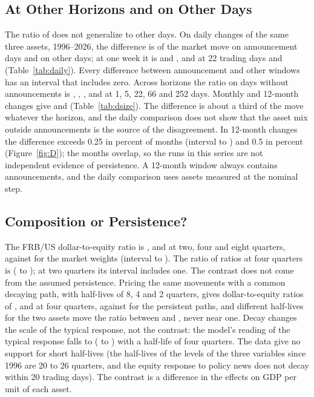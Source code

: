 \documentclass[11pt]{article}
\begin{document}
\subsection{At Other Horizons and on Other Days}\label{sec:ordinary}
The ratio of  does not generalize to other days. On daily changes of the same three assets, 1996--2026, the difference is  of the market move on announcement days and  on other days; at one week it is  and , and at 22 trading days  and  (Table~\ref{tab:daily}). Every difference between announcement and other windows has an interval that includes zero. Across horizons the ratio on days without announcements is , , ,  and  at 1, 5, 22, 66 and 252 days. Monthly and 12-month changes give  and  (Table~\ref{tab:dsize}). The difference is about a third of the move whatever the horizon, and the daily comparison does not show that the asset mix outside announcements is the source of the disagreement. In 12-month changes the difference exceeds 0.25 in  percent of months (interval  to ) and 0.5 in  percent (Figure~\ref{fig:D}); the months overlap, so the runs in this series are not independent evidence of persistence. A 12-month window always contains announcements, and the daily comparison uses assets measured at the nominal step.




\subsection{Composition or Persistence?}\label{sec:persist}
The FRB/US dollar-to-equity ratio is ,  and  at two, four and eight quarters, against  for the market weights (interval  to ). The ratio of ratios at four quarters is  ( to ); at two quarters its interval includes one. The contrast does not come from the assumed persistence. Pricing the same movements with a common decaying path, with half-lives of 8, 4 and 2 quarters, gives dollar-to-equity ratios of ,  and  at four quarters, against  for the persistent paths, and different half-lives for the two assets move the ratio between  and , never near one. Decay changes the scale of the typical response, not the contrast: the model's reading of the typical response falls to  ( to ) with a half-life of four quarters. The data give no support for short half-lives (the half-lives of the levels of the three variables since 1996 are 20 to 26 quarters, and the equity response to policy news does not decay within 20 trading days). The contrast is a difference in the effects on GDP per unit of each asset.
\end{document}
